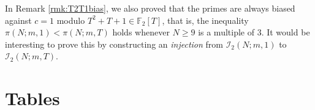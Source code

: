 \documentclass[10pt,reqno]{amsproc}
\newcommand{\bF}{\mathbb{F}}
\newcommand{\cI}{\mathcal{I}}
\newcommand{\1}{\mathds{1}}	%
\theoremstyle{definition}
\theoremstyle{remark}
\begin{document}
In Remark \ref{rmk:T2T1bias}, we also proved that the primes are always biased against $c = 1$ modulo $T^2 + T + 1 \in \bF_2[T]$, that is, the inequality $\pi(N; m, 1) < \pi(N; m, T)$ holds whenever $N \ge 9$ is a multiple of $3$.
It would be interesting to prove this by constructing an \emph{injection} from $\cI_2(N; m, 1)$ to $\cI_2(N; m, T)$.





\medskip


\newpage
\appendix

\section{Tables}
\end{document}
